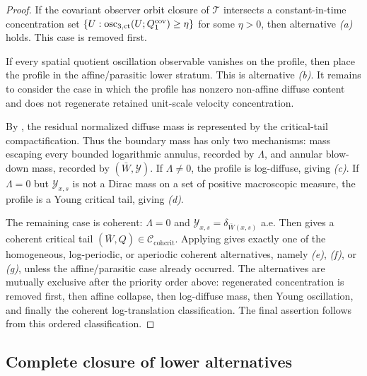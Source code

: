 \documentclass[11pt]{amsart}
\numberwithin{equation}{section}
\theoremstyle{plain}
\theoremstyle{definition}
\theoremstyle{remark}
\newcommand{\Ccohcrit}{\mathcal C_{\mathrm{cohcrit}}}
\newcommand{\actthree}{\operatorname{osc}_{3,\mathrm{ct}}}
\begin{document}
\begin{proof}
If the covariant observer orbit closure of \(\mathcal T\) intersects a
constant-in-time concentration set \(\{U:\actthree(U;Q_1^{\rm cov})\ge
\eta\}\) for some \(\eta>0\), then alternative \emph{(a)} holds.  This case is
removed first.

If every spatial quotient oscillation observable vanishes on the profile, then
place the profile in the affine/parasitic lower stratum.  This is alternative
\emph{(b)}.  It remains to consider the case in which the profile has nonzero
non-affine diffuse content and does not regenerate retained unit-scale velocity
concentration.

By , the residual normalized
diffuse mass is represented by the critical-tail compactification.  Thus the
boundary mass has only two mechanisms: mass escaping every bounded logarithmic
annulus, recorded by \(\Lambda\), and annular blow-down mass, recorded by
\((\bar W,\mathcal Y)\).  If \(\Lambda\ne0\), the profile is log-diffuse, giving
\emph{(c)}.  If \(\Lambda=0\) but \(\mathcal Y_{x,s}\) is not a Dirac mass on a
set of positive macroscopic measure, the profile is a Young critical tail, giving
\emph{(d)}.

The remaining case is coherent: \(\Lambda=0\) and
\(\mathcal Y_{x,s}=\delta_{\bar W(x,s)}\) a.e.  Then
 gives a coherent critical tail
\((\bar W,Q)\in\Ccohcrit\).  Applying
 gives exactly one of the
homogeneous, log-periodic, or aperiodic coherent alternatives, namely
\emph{(e)}, \emph{(f)}, or \emph{(g)}, unless the affine/parasitic case already
occurred.  The alternatives are mutually exclusive after the priority order
above: regenerated concentration is removed first, then affine collapse, then
log-diffuse mass, then Young oscillation, and finally the coherent
log-translation classification.  The final assertion follows from this ordered
classification.
\end{proof}

\subsection{Complete closure of lower alternatives}
\label{sec:complete-branch-closure}
\end{document}
